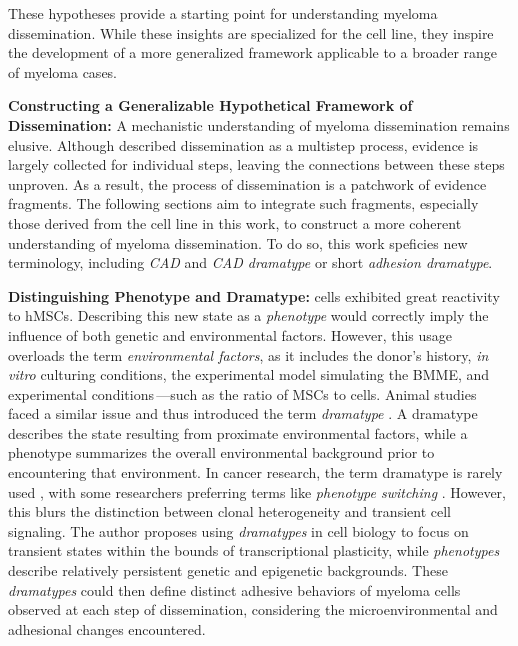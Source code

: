 These hypotheses  provide a
starting point for understanding myeloma dissemination. While these insights are
specialized for the \INA cell line, they inspire the development of a more
generalized framework applicable to a broader range of myeloma cases.



\textbf{Constructing a Generalizable Hypothetical Framework of Dissemination:}
A mechanistic understanding of myeloma dissemination remains elusive. Although
\citet{zeissigTumourDisseminationMultiple2020} described dissemination as a
multistep process, evidence is largely collected for individual steps, leaving
the connections between these steps unproven. As a result, the process of
dissemination is a patchwork of evidence fragments. The following sections aim
to integrate such fragments, especially those derived from the \INA cell line in
this work, to construct a more coherent understanding of myeloma dissemination.
To do so, this work speficies new terminology, including
\emph{\acf{CAD}}\footterm{\footcad}{\label{foot:cad}}
and \emph{\ac{CAD} dramatype}\footterm{\footcaddt}{\label{foot:caddt}}
or short \emph{adhesion dramatype}\footterm{\footadhesiondt}{\label{foot:adhesiondt}}.




\textbf{Distinguishing Phenotype and Dramatype:} \INA cells exhibited great
reactivity to \acp{hMSC}. Describing this new state as a \emph{phenotype} would
correctly imply the influence of both genetic and environmental factors.
However, this usage overloads the term \emph{environmental factors}, as it
includes the donor’s history, \textit{in vitro} culturing conditions, the
experimental model simulating the \ac{BMME}, and experimental
conditions\,---such as the ratio of \acp{MSC} to \INA cells. Animal studies
faced a similar issue and thus introduced the term \emph{dramatype}
\cite{zutphenPrinciplesLaboratoryAnimal2001}. A dramatype describes the state
resulting from proximate environmental factors, while a phenotype summarizes the
overall environmental background prior to encountering that environment. In
cancer research, the term dramatype is rarely used
\cite{hinoStudiesFamilialTumors2004}, with some researchers preferring terms
like \emph{phenotype switching} \cite{woutersRobustGeneExpression2020}. However,
this blurs the distinction between clonal heterogeneity and transient cell
signaling. The author proposes using \emph{dramatypes} in cell biology to focus
on transient states within the bounds of transcriptional plasticity, while
\emph{phenotypes} describe relatively persistent genetic and epigenetic
backgrounds. These \emph{dramatypes} could then define distinct adhesive
behaviors of myeloma cells observed at each step of dissemination, considering
the microenvironmental and adhesional changes encountered.


